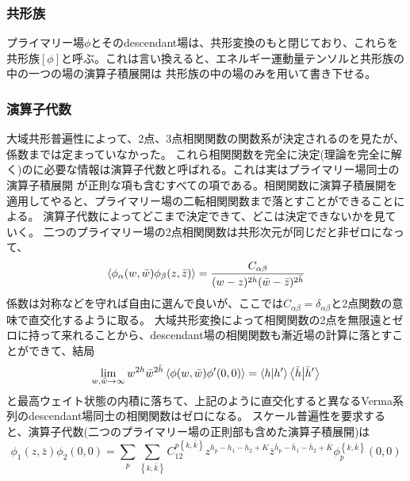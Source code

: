 \documentclass[11pt, aps, longbibliography]{article}
\numberwithin{equation}{section}
\begin{document}
        \subsubsection{共形族}
        プライマリー場$\phi$とそのdescendant場は、共形変換のもと閉じており、これらを共形族$[\phi]$と呼ぶ。これは言い換えると、エネルギー運動量テンソルと共形族の中の一つの場の演算子積展開は
        共形族の中の場のみを用いて書き下せる。

        \subsubsection{演算子代数}
        大域共形普遍性によって、2点、3点相関関数の関数系が決定されるのを見たが、係数までは定まっていなかった。
        これら相関関数を完全に決定(理論を完全に解く)のに必要な情報は演算子代数と呼ばれる。これは実はプライマリー場同士の演算子積展開
        が正則な項も含むすべての項である。相関関数に演算子積展開を適用してやると、プライマリー場の二転相関関数まで落とすことができることによる。
        演算子代数によってどこまで決定できて、どこは決定できないかを見ていく。
        二つのプライマリー場の2点相関関数は共形次元が同じだと非ゼロになって、
        \begin{equation}\label{eq:family3-1}
            \expval{\phi_\alpha(w,\bar{w})\phi_\beta(z,\bar{z})} = \frac{C_{\alpha\beta}}{(w-z)^{2h}(\bar{w}-\bar{z})^{2\bar{h}}}
        \end{equation}
        係数は対称などを守れば自由に選んで良いが、ここでは$C_{\alpha\beta}=\delta_{\alpha\beta}$と2点関数の意味で直交化するように取る。
        大域共形変換によって相関関数の2点を無限遠とゼロに持って来れることから、descendant場の相関関数も漸近場の計算に落とすことができて、結局
        \begin{equation}\label{eq:family3-2}
            \lim_{w,\bar{w}\rightarrow \infty}w^{2h}\bar{w}^{2\bar{h}}\expval{\phi(w,\bar{w})\phi^\prime(0,0)} = \braket{h}{h^\prime}\braket{\bar{h}}{\bar{h}^\prime}
        \end{equation}
        と最高ウェイト状態の内積に落ちて、上記のように直交化すると異なるVerma系列のdescendant場同士の相関関数はゼロになる。
        スケール普遍性を要求すると、演算子代数(二つのプライマリー場の正則部も含めた演算子積展開)は
        \begin{equation}\label{eq:family3-3}
            \phi_1(z,\bar{z})\phi_2(0,0) = \sum_{p}\sum_{\left\{k,\bar{k}\right\}}C_{12}^{p \left\{k,\bar{k}\right\}}z^{h_p-h_1-h_2+K}\bar{z}^{\bar{h}_p-\bar{h}_1-\bar{h}_2+\bar{K}}\phi_p^{ \left\{ k,\bar{k} \right\}}(0,0)
        \end{equation}
\end{document}
